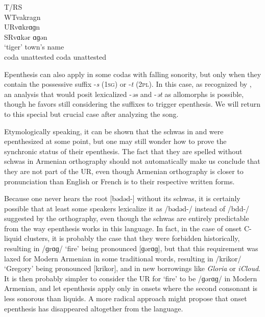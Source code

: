 \documentclass[output=paper,colorlinks,citecolor=brown]{langscibook}
\begin{document}
\begin{exe}
    \ex \label{baronian:ex8} T/RS\tab		{}\tab \tab 	\tab {}\\
WT\tab		vakr\tab \tab		\tab		agn\\
UR\tab		vɑkr\tab \tab	\tab			ɑɡn	\\	
SR\tab		vɑkər	\tab	\tab \tab		ɑɡən\\	
\tab \tab ‘tiger’	\tab \tab		\tab	town’s name \\
\tab \tab*[…kr] coda unattested	\tab *[…ɡn] coda unattested

\end{exe}


Epenthesis can also apply in some codas with falling sonority, but only when they contain the possessive suffix -\textit{s} (1\textsc{sg}) or -\textit{t} (2\textsc{pl}).  In this case, as recognized by \citet{Baronian2017}, an analysis that would posit lexicalized -\textit{əs} and -\textit{ət} as allomorphs is possible, though he favors still considering the suffixes to trigger epenthesis.  We will return to this special but crucial case after analyzing the song.

Etymologically speaking, it can be shown that the schwas in  and  were epenthesized at some point, but one may still wonder how to prove the synchronic status of their epenthesis.  The fact that they are spelled without schwas in Armenian orthography should not automatically make us conclude that they are not part of the UR, even though Armenian orthography is closer to pronunciation than English or French is to their respective written forms.

Because one never hears the root [bədəd-] without its schwas, it is certainly possible that at least some speakers lexicalize it as /bədəd-/ instead of /bdd-/ suggested by the orthography, even though the schwas are entirely predictable from the way epenthesis works in this language.  In fact, in the case of onset C-liquid clusters, it is probably the case that they were forbidden historically, resulting in /ɡrɑɡ/ ‘fire’ being pronounced [ɡərɑɡ], but that this requirement was laxed for Modern Armenian in some traditional words, resulting in /krikor/ ‘Gregory’ being pronounced [krikor], and in new borrowings like \textit{Gloria} or \textit{iCloud}.  It is then probably simpler to consider the UR for ‘fire’ to be /ɡərɑɡ/ in Modern Armenian, and let epenthesis apply only in onsets where the second consonant is less sonorous than liquids.   A more radical approach might propose that onset epenthesis has disappeared altogether from the language.
\end{document}
